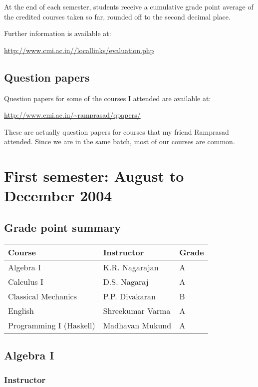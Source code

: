 \documentclass[a4paper]{amsart}
\begin{document}
At the end of each semester, students receive a cumulative grade point
average of the credited courses taken so far, rounded off to the
second decimal place.

Further information is available at:

\url{http://www.cmi.ac.in//locallinks/evaluation.php}

\subsection{Question papers}

Question papers for some of the courses I attended are available at:

\url{http://www.cmi.ac.in/~ramprasad/qpapers/}

These are actually question papers for courses that my friend
Ramprasad attended. Since we are in the same batch, most of our
courses are common.

\section{First semester: August to December 2004}\label{sem1}

\subsection{Grade point summary}\label{sem1gps}

\begin{tabular}{|l|l|l|}
  \hline
  Course & Instructor & Grade \\
  \hline
  Algebra I & K.R. Nagarajan & A \\
  Calculus I & D.S. Nagaraj & A \\
  Classical Mechanics & P.P. Divakaran & B\\
  English & Shreekumar Varma & A\\
  Programming I (Haskell) & Madhavan Mukund & A \\
  \hline
\end{tabular}
\subsection{Algebra I}\label{algebra1}

\subsubsection{Instructor}
\end{document}

